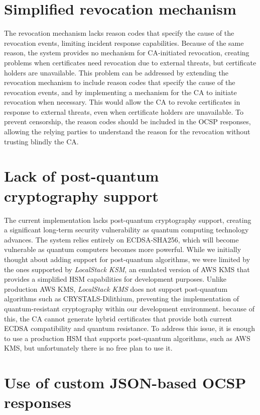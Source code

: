 \section{Simplified revocation mechanism}

The revocation mechanism lacks reason codes that specify the cause of the revocation events, 
limiting incident response capabilities. Because of the same reason, the system provides no mechanism 
for CA-initiated revocation, creating problems when certificates need revocation due to external 
threats, but certificate holders are unavailable.
This problem can be addressed by extending the revocation mechanism to include reason codes that specify 
the cause of the revocation events, and by implementing a mechanism for the CA to initiate revocation 
when necessary. This would allow the CA to revoke certificates in response to external threats, 
even when certificate holders are unavailable. To prevent censorship, the reason codes should be included
in the OCSP responses, allowing the relying parties to understand the reason for the revocation
without trusting blindly the CA.


\section{Lack of post-quantum cryptography support}

The current implementation lacks post-quantum cryptography support, creating a significant 
long-term security vulnerability as quantum computing technology advances. The system relies entirely 
on ECDSA-SHA256, which will become vulnerable as quantum computers becomes more powerful.
While we initially thought about adding support for post-quantum algorithms, we were limited by the ones 
supported by \textit{LocalStack KSM}, an emulated version of AWS KMS that provides a 
simplified HSM capabilities for development purposes. Unlike production AWS KMS, \textit{LocalStack KMS} does 
not support post-quantum algorithms such as CRYSTALS-Dilithium, preventing the 
implementation of quantum-resistant cryptography within our development environment. because of this,
the CA cannot generate hybrid certificates that provide both current ECDSA compatibility 
and quantum resistance.
To address this issue, it is enough to use a production HSM that supports post-quantum algorithms, such as AWS KMS,
but unfortunately there is no free plan to use it.

\section{Use of custom JSON-based OCSP responses}

